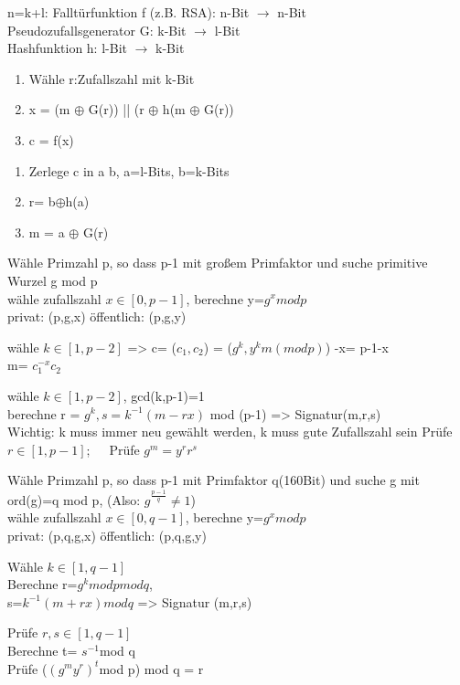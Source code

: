 n=k+l:
Falltürfunktion f (z.B. RSA): n-Bit $\to$ n-Bit\\
Pseudozufallsgenerator G: k-Bit $\to$ l-Bit\\
Hashfunktion h: l-Bit $\to$ k-Bit\\
\begin{multicols}{2}
\begin{enumerate}
	\item Wähle r:Zufallszahl mit k-Bit
	\item x = (m $\oplus$ G(r)) || (r $\oplus$ h(m $\oplus$ G(r))
	\item c = f(x)
\end{enumerate}

\begin{enumerate}
	\item Zerlege c in a b,  a=l-Bits, b=k-Bits
	\item r= b$\oplus$h(a)
	\item m = a $\oplus$ G(r)
\end{enumerate}
\end{multicols}

Wähle Primzahl p, so dass p-1 mit großem Primfaktor und suche primitive Wurzel g mod p\\
wähle zufallszahl $x \in [0,p-1]$, berechne y=$g^x mod p$\\
privat: (p,g,x) öffentlich: (p,g,y)

\begin{multicols}{2}
wähle $k \in [1,p-2]$ => c= ($c_1,c_2$) = ($g^k, y^km(modp)$)
-x= p-1-x\\
m= $c_1^{-x}c_2$
\end{multicols}

\begin{multicols}{2}
wähle $k \in [1,p-2]$, gcd(k,p-1)=1\\
berechne r = $g^k, s=k^{-1}(m-rx)$ mod (p-1) => Signatur(m,r,s)\\
Wichtig: k muss immer neu gewählt werden, k muss gute Zufallszahl sein
Prüfe $r \in [1,p-1]$;~~~Prüfe $g^m = y^rr^s$
\end{multicols}

Wähle Primzahl p, so dass p-1 mit Primfaktor q(160Bit) und suche g mit ord(g)=q mod p, (Also: $g^{\frac{p-1}{q}} \neq 1$)\\
wähle zufallszahl $x \in [0,q-1]$, berechne y=$g^x mod p$\\
privat: (p,q,g,x) öffentlich: (p,q,g,y)

\begin{multicols}{2}
Wähle $k \in [1,q-1]$\\
Berechne r=$g^k mod p mod q$, \\
s=$k^{-1}(m+rx)mod q$ => Signatur (m,r,s)

Prüfe $r,s \in [1,q-1]$\\
Berechne t= $s^{-1}$mod q\\
Prüfe ($(g^my^r)^t$mod p) mod q = r
\end{multicols}